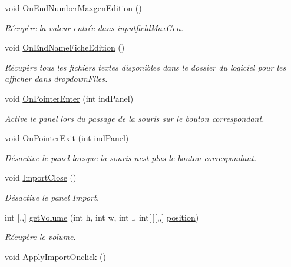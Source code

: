 \begin{DoxyCompactItemize}
void \mbox{\hyperlink{class_parameters_a4167680889821ca1d2f3bc487b0bebae}{On\+End\+Number\+Maxgen\+Edition}} ()
\begin{DoxyCompactList}\small\item\em Récupère la valeur entrée dans inputfield\+Max\+Gen. \end{DoxyCompactList}\item 
void \mbox{\hyperlink{class_parameters_ad3db64cd1a228cb925a9afd7f32332a5}{On\+End\+Name\+Fiche\+Edition}} ()
\begin{DoxyCompactList}\small\item\em Récupère tous les fichiers textes disponibles dans le dossier du logiciel pour les afficher dans dropdown\+Files. \end{DoxyCompactList}\item 
void \mbox{\hyperlink{class_parameters_aa0a97bc80e6c1cdf8a43513c187f33aa}{On\+Pointer\+Enter}} (int ind\+Panel)
\begin{DoxyCompactList}\small\item\em Active le panel lors du passage de la souris sur le bouton correspondant. \end{DoxyCompactList}\item 
void \mbox{\hyperlink{class_parameters_a711df8be88106725f5e1cf4bf74a5e21}{On\+Pointer\+Exit}} (int ind\+Panel)
\begin{DoxyCompactList}\small\item\em Désactive le panel lorsque la souris n\textquotesingle{}est plus le bouton correspondant. \end{DoxyCompactList}\item 
void \mbox{\hyperlink{class_parameters_a95a34ed3f54953655b8caf704caff1f5}{Import\+Close}} ()
\begin{DoxyCompactList}\small\item\em Désactive le panel Import. \end{DoxyCompactList}\item 
int \mbox{[},,\mbox{]} \mbox{\hyperlink{class_parameters_a5e16007361a29535bbad70f4f0a466bc}{get\+Volume}} (int h, int w, int l, int\mbox{[}$\,$\mbox{]}\mbox{[},,\mbox{]} \mbox{\hyperlink{class_parameters_ad01c1db17d90b97c666abf21a9c6fcd1}{position}})
\begin{DoxyCompactList}\small\item\em Récupère le volume. \end{DoxyCompactList}\item 
void \mbox{\hyperlink{class_parameters_a8438e2686a572fc6d1cc2947489da01d}{Apply\+Import\+Onclick}} ()

\end{DoxyCompactItemize}
